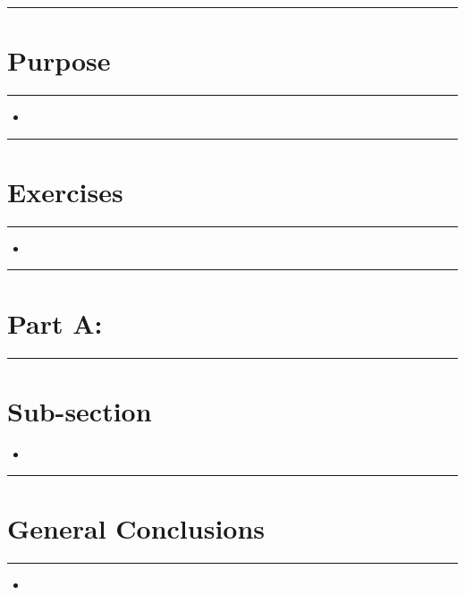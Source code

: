 \documentclass[hidelinks, 11pt, dvipsnames]{article}
\title{  } %
\author{  } %
\newcommand{\reportsection}[1]{{
    \begin{center}
        \noindent \rule{17cm}{0.4pt}
            \section*{\LARGE #1}
        \noindent \rule{17cm}{0.4pt}
    \end{center}
}}
\newcommand{\reportsubsection}[1]{{\section*{#1}}}
\begin{document}
\maketitle

\newpage

\reportsection{Purpose}

\begin{itemize}
    \item 
\end{itemize}

\newpage

\reportsection{Exercises}

\begin{itemize}
    \item 
\end{itemize}

\newpage

\reportsection{Part A: }

\reportsubsection{Sub-section}

\begin{itemize}
    \item 
\end{itemize}

\newpage

\reportsection{General Conclusions}

\begin{itemize}
    \item 
\end{itemize}
\end{document}
